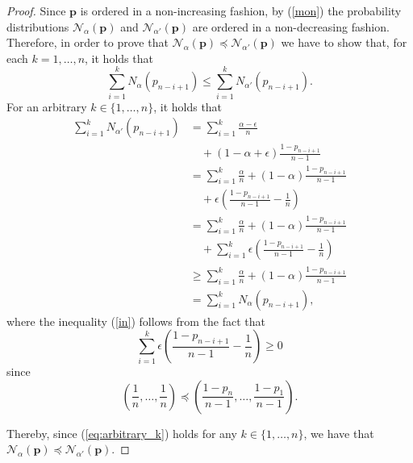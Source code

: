 \documentclass[10pt,a4paper]{amsart}
\newcommand{\N}{\mathcal{N}}
\newcommand{\bp}{\mathbf{p}}
\begin{document}
\begin{proof}
Since $\bp$ is ordered in a non-increasing fashion, by (\ref{mon}) the probability distributions 
$\N_\alpha(\bp)$ and $\N_{\alpha'}(\bp)$ are ordered in a non-decreasing fashion. Therefore, in order to prove that $\N_\alpha(\bp)\preceq \N_{\alpha'}(\bp)$ we have to show that, for each $k=1,\dots,n$, it holds that
\begin{equation}
    \sum_{i=1}^k N_{\alpha}(p_{n-i+1}) \leq \sum_{i=1}^kN_{\alpha'}(p_{n-i+1}).\label{eq:to_prove}
\end{equation}
For an arbitrary $k\in\{1,\dots,n\}$, it holds that
\begin{align}
    \sum_{i=1}^kN_{\alpha'}(p_{n-i+1}) &= \sum_{i=1}^k \frac{\alpha - \epsilon}{n} \nonumber\\&\quad+ (1-\alpha+\epsilon)\frac{1-p_{n-i+1}}{n-1}\nonumber\\
    &=\sum_{i=1}^k \frac{\alpha}{n} + (1-\alpha)\frac{1-p_{n-i+1}}{n-1}\nonumber\\&\quad+ \epsilon\left(\frac{1-p_{n-i+1}}{n-1} - \frac{1}{n}\right)\nonumber\\
    &=\sum_{i=1}^k \frac{\alpha}{n} + (1-\alpha)\frac{1-p_{n-i+1}}{n-1}\nonumber\\&\quad+ \sum_{i=1}^k \epsilon\left(\frac{1-p_{n-i+1}}{n-1} - \frac{1}{n}\right)\nonumber\\
    &\geq \sum_{i=1}^k \frac{\alpha}{n} + (1-\alpha)\frac{1-p_{n-i+1}}{n-1}\label{in}\\
    &=\sum_{i=1}^k N_{\alpha}(p_{n-i+1}),\label{eq:arbitrary_k}
\end{align}
where the inequality (\ref{in}) follows from the fact that 
$$\sum_{i=1}^k \epsilon\left(\frac{1-p_{n-i+1}}{n-1} - \frac{1}{n}\right)\geq 0$$ since 
$$\left(\frac{1}{n},\dots,\frac{1}{n}\right) \preceq \left(\frac{1-p_n}{n-1},\dots,\frac{1-p_1}{n-1}\right).$$

Thereby, since (\ref{eq:arbitrary_k}) holds for any $k\in\{1,\dots,n\}$, we have that $\N_\alpha(\bp)\preceq\N_{\alpha'}(\bp)$.
\end{proof}
\end{document}
